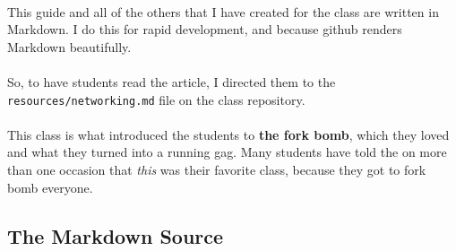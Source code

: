 \documentclass[11pt]{article}
\begin{document}
	\paragraph{} This guide and all of the others that I have created for the class are written in Markdown. I do this for rapid development, and because github renders Markdown beautifully. 

	\paragraph{} So, to have students read the article, I directed them to the \texttt{resources/networking.md} file on the class repository.

	\begin{center}
		\graphicspath{ {.} }
		\centering
	\end{center}

	\paragraph{} This class is what introduced the students to \textbf{the fork bomb}, which they loved and what they turned into a running gag. Many students have told the on more than one occasion that \textit{this} was their favorite class, because they got to fork bomb everyone.

	\subsection{The Markdown Source}
\end{document}
